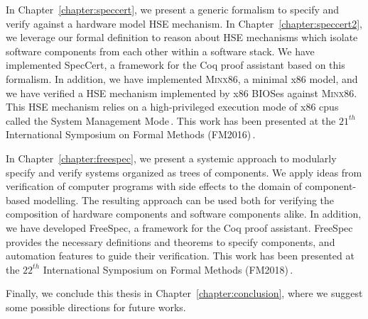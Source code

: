 In Chapter~\ref{chapter:speccert}, we present a generic formalism to specify and
verify against a hardware model HSE mechanism.
%
In Chapter~\ref{chapter:speccert2}, we leverage our formal
definition to reason about HSE mechanisms which isolate software components from
each other within a software stack.
%
We have implemented SpecCert, a framework for the Coq proof assistant based on
this formalism. In addition, we have implemented {\scshape Minx86}, a minimal
x86 model, and we have verified a HSE mechanism implemented by x86 BIOSes
against {\scshape Minx86}.
%
This HSE mechanism relies on a high-privileged execution mode of x86 \acp{cpu}
called the System Management Mode\,\cite{intel2014manual}.
%
This work has been presented at the $21^{th}$ International Symposium on Formal
Methods (FM2016)\,\cite{letan2016speccert}.

In Chapter~\ref{chapter:freespec}, we present a systemic approach to modularly
specify and verify systems organized as trees of components.
%
We apply ideas from verification of computer programs with side effects to the
domain of component-based modelling. The resulting approach can be used both for
verifying the composition of hardware components and software components alike.
%
In addition, we have developed FreeSpec, a framework for the Coq proof
assistant.
%
FreeSpec provides the necessary definitions and theorems to specify components,
and automation features to guide their verification.
%
This work has been presented at the $22^{th}$ International Symposium on Formal
Methods (FM2018)\,\cite{letan2018freespec}.

Finally, we conclude this thesis in Chapter~\ref{chapter:conclusion}, where we
suggest some possible directions for future works.
